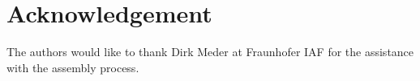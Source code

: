 \documentclass[journal]{IEEEtran}
\begin{document}

\section*{Acknowledgement}
The authors would like to thank Dirk Meder at Fraunhofer IAF for the assistance with the assembly process.




\nocite{*}
\end{document}
